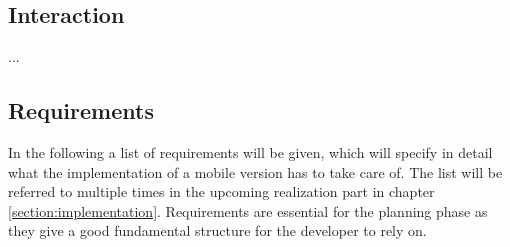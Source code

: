 \subsection{Interaction}
...
\subsection{Requirements}
In the following a list of requirements will be given, which will specify in detail what the implementation of a mobile version has to take care of.
The list will be referred to multiple times in the upcoming realization part in chapter \ref{section:implementation}.
Requirements are essential for the planning phase as they give a good fundamental structure for the developer to rely on. \cite{Robertson2012,Stevens2005}